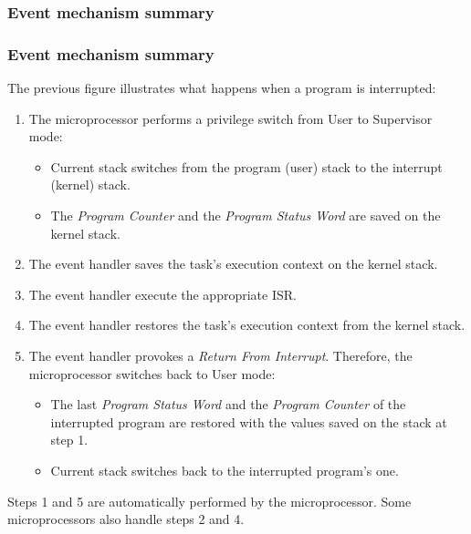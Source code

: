 %
%
%

\begin{frame}
  \frametitle{Event mechanism summary}


\end{frame}

%
%
%

\begin{frame}
  \frametitle{Event mechanism summary}

  The previous figure illustrates what happens when a program is interrupted:

  \-

  \begin{enumerate}
    \item The microprocessor performs a privilege switch from User to Supervisor
      mode:
      \begin{itemize}
        \item Current stack switches from the program (user) stack to the
	  interrupt (kernel) stack.
        \item The {\em Program Counter} and the {\em Program Status Word} are
	 saved on the kernel stack.
      \end{itemize}
    \item The event handler saves the task's execution context on the kernel
      stack.
    \item The event handler execute the appropriate ISR.
    \item The event handler restores the task's execution context from the
      kernel stack.
    \item The event handler provokes a {\em Return From Interrupt}. Therefore,
      the microprocessor switches back to User mode:
    \begin{itemize}
      \item The last {\em Program Status Word} and the {\em Program Counter}
        of the interrupted program are restored with the values saved on the
	stack at step 1.
      \item Current stack switches back to the interrupted program's one.
    \end{itemize}
  \end{enumerate}

  \-

  Steps 1 and 5 are automatically performed by the microprocessor. Some
  microprocessors also handle steps 2 and 4.

\end{frame}


